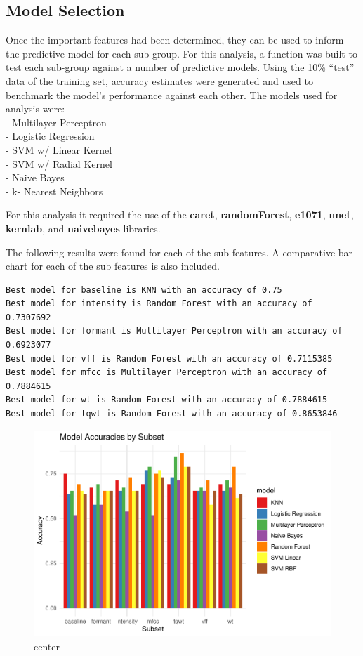\documentclass[
]{article}
\begin{document}
\hypertarget{model-selection}{%
\subsection{Model Selection}\label{model-selection}}

Once the important features had been determined, they can be used to inform the predictive model for each sub-group.
For this analysis, a function was built to test each sub-group against a number of predictive models. Using the 10\% ``test'' data of the training set, accuracy estimates were generated and used to benchmark the model's performance against each other. The models used for analysis were:\\
- Multilayer Perceptron\\
- Logistic Regression\\
- SVM w/ Linear Kernel\\
- SVM w/ Radial Kernel\\
- Naive Bayes\\
- k- Nearest Neighbors

For this analysis it required the use of the \textbf{caret}, \textbf{randomForest}, \textbf{e1071}, \textbf{nnet}, \textbf{kernlab}, and \textbf{naivebayes} libraries.

The following results were found for each of the sub features. A comparative bar chart for each of the sub features is also included.

\begin{verbatim}
Best model for baseline is KNN with an accuracy of 0.75 
Best model for intensity is Random Forest with an accuracy of 0.7307692 
Best model for formant is Multilayer Perceptron with an accuracy of 0.6923077 
Best model for vff is Random Forest with an accuracy of 0.7115385 
Best model for mfcc is Multilayer Perceptron with an accuracy of 0.7884615 
Best model for wt is Random Forest with an accuracy of 0.7884615 
Best model for tqwt is Random Forest with an accuracy of 0.8653846 
\end{verbatim}

\begin{figure}
\includegraphics[width=1\linewidth,height=1\textheight]{figure/unnamed-chunk-12-1} \caption{center}\label{fig:unnamed-chunk-12}
\end{figure}
\end{document}
